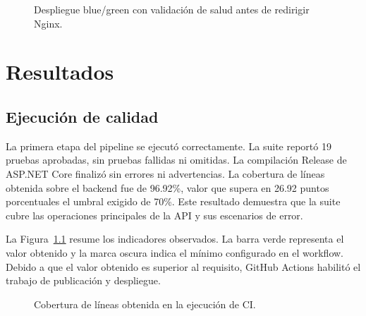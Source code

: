 \documentclass[12pt,a4paper]{report}
\begin{document}
\begin{figure}[H]
\centering
{}
\caption{Despliegue blue/green con validación de salud antes de redirigir Nginx.}
\label{fig:bluegreen}
\end{figure}

\chapter{Resultados}

\section{Ejecución de calidad}

La primera etapa del pipeline se ejecutó correctamente. La suite reportó 19 pruebas aprobadas, sin pruebas fallidas ni omitidas. La compilación Release de ASP.NET Core finalizó sin errores ni advertencias. La cobertura de líneas obtenida sobre el backend fue de 96.92\%, valor que supera en 26.92 puntos porcentuales el umbral exigido de 70\%. Este resultado demuestra que la suite cubre las operaciones principales de la API y sus escenarios de error.

La Figura~\ref{fig:quality-results} resume los indicadores observados. La barra verde representa el valor obtenido y la marca oscura indica el mínimo configurado en el workflow. Debido a que el valor obtenido es superior al requisito, GitHub Actions habilitó el trabajo de publicación y despliegue.

\begin{figure}[H]
\centering
{}
\caption{Cobertura de líneas obtenida en la ejecución de CI.}
\label{fig:quality-results}
\end{figure}
\end{document}
